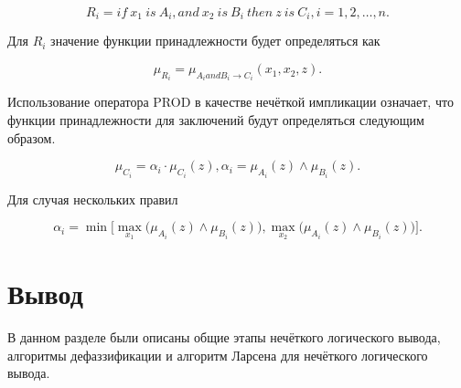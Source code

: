 \label{rule}
\begin{equation}
	R_i = if~x_1~is~A_i, and~x_2~is~B_i~then~z~is~C_i, i = 1,2,  \dots , n.
\end{equation}

Для $R_i$ значение функции принадлежности будет определяться как

\begin{equation}
	\mu_{R_i} = \mu_{A_i and B_i \rightarrow C_i}(x_1, x_2, z).
\end{equation}

Использование оператора PROD в качестве нечёткой импликации означает, что функции принадлежности для заключений будут определяться следующим образом. \cite{article}

\begin{equation}
	\mu_{C_i} = \alpha_i\cdot\mu_{C_i}(z),
	\alpha_i = \mu_{A_i}(z) \wedge \mu_{B_i}(z).
\end{equation}

Для случая нескольких правил

\begin{equation}
	\alpha_i = \min\Big[\max_{x_1}\Big(\mu_{A_i}(z) \wedge \mu_{B_i}(z)\Big), \max_{x_2}\Big(\mu_{A_i}(z) \wedge \mu_{B_i}(z)\Big)\Big].
\end{equation}



\section*{Вывод}

В данном разделе были описаны общие этапы нечёткого логического вывода, алгоритмы дефаззификации и алгоритм Ларсена для нечёткого логического вывода.

\clearpage
